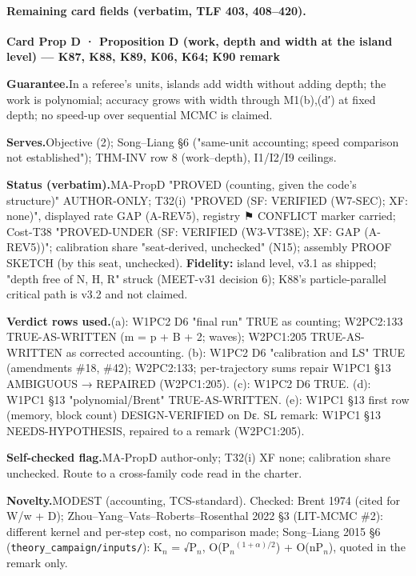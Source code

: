 \paragraph{Remaining card fields (verbatim, TLF 403, 408–420).}
{\small
\par\smallskip\noindent\textbf{Card Prop D · Proposition D (work, depth and width at the island level) — K87, K88, K89, K06, K64; K90 remark}
\par\smallskip\noindent\textbf{Guarantee.}\enspace In a referee's units, islands add width without adding depth; the work is polynomial; accuracy grows with width through M1(b),(d′) at fixed depth; no speed-up over sequential MCMC is claimed.
\par\smallskip\noindent\textbf{Serves.}\enspace Objective (2); Song–Liang §6 ("same-unit accounting; speed comparison not established"); THM-INV row 8 (work–depth), I1/I2/I9 ceilings.
\par\smallskip\noindent\textbf{Status (verbatim).}\enspace MA-PropD "PROVED (counting, given the code's structure)" AUTHOR-ONLY; T32(i) "PROVED (SF: VERIFIED (W7-SEC); XF: none)", displayed rate GAP (A-REV5), registry ⚑ CONFLICT marker carried; Cost-T38 "PROVED-UNDER (SF: VERIFIED (W3-VT38E); XF: GAP (A-REV5))"; calibration share "seat-derived, unchecked" (N15); assembly PROOF SKETCH (by this seat, unchecked). \textbf{Fidelity:} island level, v3.1 as shipped; "depth free of N, H, R" struck (MEET-v31 decision 6); K88's particle-parallel critical path is v3.2 and not claimed.
\par\smallskip\noindent\textbf{Verdict rows used.}\enspace (a): W1PC2 D6 "final run" TRUE as counting; W2PC2:133 TRUE-AS-WRITTEN (m = p + B + 2; waves); W2PC1:205 TRUE-AS-WRITTEN as corrected accounting. (b): W1PC2 D6 "calibration and LS" TRUE (amendments \#18, \#42); W2PC2:133; per-trajectory sums repair W1PC1 §13 AMBIGUOUS → REPAIRED (W2PC1:205). (c): W1PC2 D6 TRUE. (d): W1PC1 §13 "polynomial/Brent" TRUE-AS-WRITTEN. (e): W1PC1 §13 first row (memory, block count) DESIGN-VERIFIED on Dε. SL remark: W1PC1 §13 NEEDS-HYPOTHESIS, repaired to a remark (W2PC1:205).
\par\smallskip\noindent\textbf{Self-checked flag.}\enspace MA-PropD author-only; T32(i) XF none; calibration share unchecked. Route to a cross-family code read in the charter.
\par\smallskip\noindent\textbf{Novelty.}\enspace MODEST (accounting, TCS-standard). Checked: Brent 1974 (cited for W/w + D); Zhou–Yang–Vats–Roberts–Rosenthal 2022 §3 (LIT-MCMC \#2): different kernel and per-step cost, no comparison made; Song–Liang 2015 §6 (\texttt{theory\_campaign/inputs/}): K$_{n}$ = √P$_{n}$, O(P$_{n}$$^{(1+α)/2}$) + O(nP$_{n}$), quoted in the remark only.
$$}
